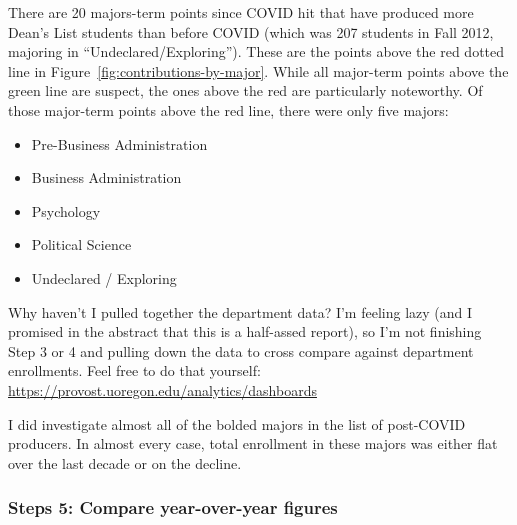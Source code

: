 \documentclass[10]{article}
\begin{document}
There are 20 majors-term points since COVID hit that have produced more Dean's List students than before COVID (which was 207 students in Fall 2012, majoring in ``Undeclared/Exploring''). These are the points above the red dotted line in Figure~\ref{fig:contributions-by-major}. While all major-term points above the green line are suspect, the ones above the red are particularly noteworthy. Of those major-term points above the red line, there were only five majors:

\begin{itemize}
	\item Pre-Business Administration
	\item Business Administration
	\item Psychology
	\item Political Science
	\item Undeclared / Exploring
\end{itemize}



Why haven't I pulled together the department data? I'm feeling lazy (and I promised in the abstract that this is a half-assed report), so I'm not finishing Step 3 or 4 and pulling down the data to cross compare against department enrollments. Feel free to do that yourself: \url{https://provost.uoregon.edu/analytics/dashboards}

I did investigate almost all of the bolded majors in the list of post-COVID producers. In almost every case, total enrollment in these majors was either flat over the last decade or on the decline.



\subsubsection{Steps 5: Compare year-over-year figures}

\qquad


\end{document}

